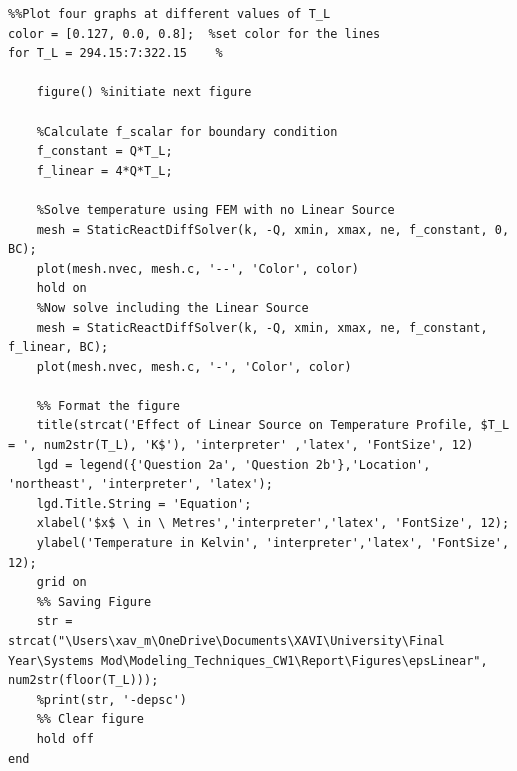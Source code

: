 \documentclass[11pt]{article}
\begin{document}
\begin{appendices}
\begin{lstlisting}
%%Plot four graphs at different values of T_L
color = [0.127, 0.0, 0.8];  %set color for the lines
for T_L = 294.15:7:322.15    %
    
    figure() %initiate next figure
    
    %Calculate f_scalar for boundary condition
    f_constant = Q*T_L;
    f_linear = 4*Q*T_L;
    
    %Solve temperature using FEM with no Linear Source
    mesh = StaticReactDiffSolver(k, -Q, xmin, xmax, ne, f_constant, 0, BC);
    plot(mesh.nvec, mesh.c, '--', 'Color', color)
    hold on
    %Now solve including the Linear Source
    mesh = StaticReactDiffSolver(k, -Q, xmin, xmax, ne, f_constant, f_linear, BC);
    plot(mesh.nvec, mesh.c, '-', 'Color', color)
    
    %% Format the figure
    title(strcat('Effect of Linear Source on Temperature Profile, $T_L = ', num2str(T_L), 'K$'), 'interpreter' ,'latex', 'FontSize', 12)
    lgd = legend({'Question 2a', 'Question 2b'},'Location', 'northeast', 'interpreter', 'latex');
    lgd.Title.String = 'Equation';
    xlabel('$x$ \ in \ Metres','interpreter','latex', 'FontSize', 12);
    ylabel('Temperature in Kelvin', 'interpreter','latex', 'FontSize', 12);
    grid on
    %% Saving Figure
    str = strcat("\Users\xav_m\OneDrive\Documents\XAVI\University\Final Year\Systems Mod\Modeling_Techniques_CW1\Report\Figures\epsLinear", num2str(floor(T_L)));
    %print(str, '-depsc')
    %% Clear figure
    hold off
end
\end{lstlisting}

\end{appendices}
\end{document}
